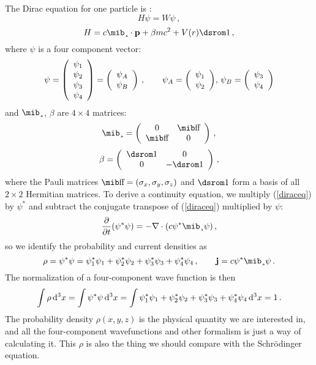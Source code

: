 The Dirac equation for one particle is \cite{strange,zabloudil}: 
\begin{equation}
  H\psi=W\psi\,,  \label{diraceq}
\end{equation}
\begin{equation*}
  H=c\balpha\cdot{\bf p}+\beta mc^2+V(r)\hbox{\dsrom1}\,,
\end{equation*}
where $\psi$ is a four component vector: 
\begin{equation*}
  \psi=\left(
\begin{array}{c}
\psi_1\\
\psi_2\\
\psi_3\\
\psi_4\\
\end{array}
\right) =\left(\begin{array}{c} \psi_A\\ \psi_B\\ \end{array}\right)\,,\qquad \psi_A=\left(\begin{array}{c} \psi_1\\ \psi_2\\ \end{array}\right)\!,\,\psi_B=\left(\begin{array}{c} \psi_3\\ \psi_4\\ \end{array}\right)
\end{equation*}
and $\balpha$, $\beta$ are $4\times4$ matrices: 
\begin{equation*}
  \balpha=\mat{0}{\bsigma}{\bsigma}{0}\,,
\end{equation*}
\begin{equation*}
  \beta=\mat{\hbox{\dsrom1}}{0}{0}{-\hbox{\dsrom1}}\,,
\end{equation*}
where the Pauli matrices $\bsigma=(\sigma_x,\sigma_y,\sigma_z)$ and $\hbox{\dsrom1}$ form a basis of all $2\times2$ Hermitian matrices. To derive a continuity equation, we multiply (\ref{diraceq}) by $\psi^*$ and subtract the conjugate transpose of (\ref{diraceq}) multiplied by $\psi$: 
\begin{equation*}
  \p{}{t}(\psi^*\psi)=-\nabla\cdot(c\psi^*\balpha\psi)\,,
\end{equation*}
so we identify the probability and current densities as 
\begin{equation*}
  \rho=\psi^*\psi=\psi_1^*\psi_1+\psi_2^*\psi_2+\psi_3^*\psi_3+\psi_4^*\psi_4\,, \qquad {\bf j}=c\psi^*\balpha\psi\,.
\end{equation*}
The normalization of a four-component wave function is then 
\begin{equation}
  \int \rho \,{\rm d}^3x= \int \psi^*\psi \,{\rm d}^3x= \int \psi_1^*\psi_1+\psi_2^*\psi_2+\psi_3^*\psi_3+\psi_4^*\psi_4 \,{\rm d}^3x= 1\,.  \label{norm}
\end{equation}
The probability density $\rho(x,y,z)$ is the physical quantity we are interested in, and all the four-component wavefunctions and other formalism is just a way of calculating it. This $\rho$ is also the thing we should compare with the Schrödinger equation.

